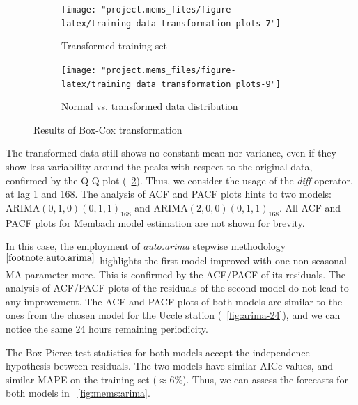 \documentclass[12pt]{article}
\begin{document}
\begin{figure}[h]
	\begin{subfigure}{.5\linewidth}
		\texttt{[image: "project.mems\_files/figure-latex/training data transformation plots-7"]}
		\caption{Transformed training set}
		\label{fig:mems:box-cox:data}
	\end{subfigure}
	\begin{subfigure}{.5\linewidth}
		\texttt{[image: "project.mems\_files/figure-latex/training data transformation plots-9"]}
		\caption{Normal vs. transformed data distribution}
		\label{fig:mems:box-cox:qq}
	\end{subfigure}
	\caption{Results of Box-Cox transformation}
	\label{fig:mems:box-cox}
\end{figure}
%
The transformed data still shows no constant mean nor variance, even if they show less variability around the peaks with respect to the original data, confirmed by the Q-Q plot (\figurename~\ref{fig:mems:box-cox:qq}). Thus, we consider the usage of the \textit{diff} operator, at lag 1 and 168. The analysis of ACF and PACF plots hints to two models: $\mathrm{ARIMA}(0,1,0)(0,1,1)_{168}$ and $\mathrm{ARIMA}(2,0,0)(0,1,1)_{168}$. All ACF and PACF plots for Membach model estimation are not shown for brevity.

In this case, the employment of \textit{auto.arima} stepwise methodology$^{\ref{footnote:auto.arima}}$ highlights the first model improved with one non-seasonal MA parameter more. This is confirmed by the ACF/PACF of its residuals.
The analysis of ACF/PACF plots of the residuals of the second model do not lead to any improvement.
The ACF and PACF plots of both models are similar to the ones from the chosen model for the Uccle station (\figurename~\ref{fig:arima-24}), and we can notice the same 24 hours remaining periodicity.

The Box-Pierce test statistics for both models accept the independence hypothesis between residuals. The two models have similar AICc values, and similar MAPE on the training set ($\approx6\%$). Thus, we can assess the forecasts for both models in \figurename~\ref{fig:mems:arima}.
\end{document}
